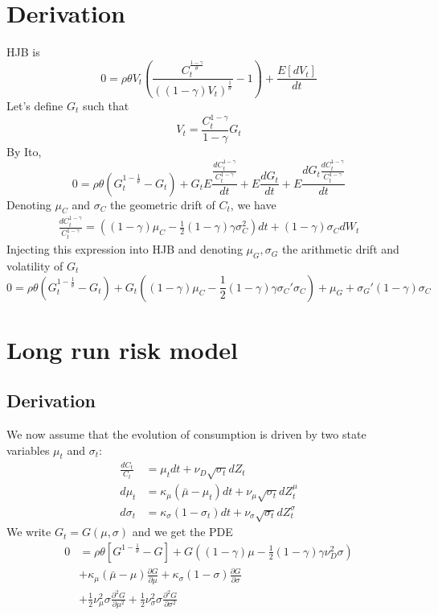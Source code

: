 \documentclass[english]{article}
\begin{document}
\section{Derivation}
HJB is
$$0 = \rho \theta V_t(\frac{C_t^{\frac{1-\gamma}{\theta}}}{((1-\gamma)V_t)^{\frac{1}{\theta}}}-1) + \frac{E[dV_t]}{dt}$$
Let's define $G_t$ such that
$$V_t = \frac{C_t^{1-\gamma}}{1-\gamma} G_t$$
By Ito, 
$$0 = \rho\theta(G_t^{1-\frac{1}{\theta}}-G_t)   +  G_t E\frac{\frac{dC_t^{1-\gamma}}{C_t^{1-\gamma}}}{dt} + E\frac{dG_t}{dt} + E\frac{dG_t\frac{dC_t^{1-\gamma}}{C_t^{1-\gamma}}}{dt}$$
Denoting $\mu_{C}$ and $\sigma_{C}$ the geometric drift of $C_t$, we have
\begin{align*}
	\frac{dC_{t}^{1-\gamma}}{C_{t}^{1-\gamma}}=((1-\gamma)\mu_{C}-\frac{1}{2}(1-\gamma)\gamma\sigma^{2}_{C})dt + (1-\gamma)\sigma_{C}dW_t
\end{align*}
Injecting this expression into HJB and denoting $\mu_G, \sigma_G$ the arithmetic drift and volatility of $G_t$
$$0 = \rho \theta (G_t^{1-\frac{1}{\theta}}-G_t)  + G_t ((1-\gamma) \mu_{C} - \frac{1}{2}(1-\gamma)\gamma\sigma_{C}'\sigma_{C}) +  \mu_G + \sigma_G'(1-\gamma)\sigma_{C}$$

\section{Long run risk model}

\subsection{Derivation}
We now assume that the evolution of consumption is driven by two state variables $\mu_{t}$ and $\sigma_{t}$:
\begin{align*}
	\frac{dC_{t}}{C_{t}} & =  \mu_{t}dt+\nu_{D}\sqrt{\sigma_{t}}dZ_{t}\\
	d\mu_{t} & =  \kappa_{\mu}(\bar{\mu}-\mu_{t})dt+\nu_{\mu}\sqrt{\sigma_{t}}dZ_{t}^{\mu}\\
	d\sigma_{t} & =  \kappa_{\sigma}(1-\sigma_{t})dt+\nu_{\sigma}\sqrt{\sigma_{t}}dZ_{t}^{\sigma}
\end{align*}
We write $G_t = G(\mu, \sigma)$ and we get the PDE
\begin{align*}
	0&= \rho \theta[G^{1-\frac{1}{\theta}}- G]+G((1-\gamma)\mu-\frac{1}{2}(1-\gamma)\gamma\nu_D^2\sigma)\\
	&+ \kappa_{\mu}(\bar{\mu}-\mu)\frac{\partial G}{\partial\mu}+  \kappa_{\sigma}(1-\sigma)\frac{\partial G}{\partial\sigma}\\
	&+\frac{1}{2}\nu_{\mu}^{2}\sigma\frac{\partial^{2}G}{\partial\mu^{2}}+\frac{1}{2}\nu_{\sigma}^{2}\sigma \frac{\partial^{2}G}{\partial\sigma^{2}}
\end{align*}
\end{document}
